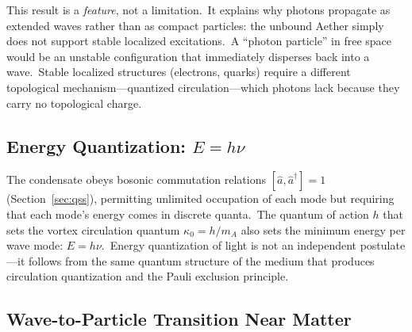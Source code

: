 ﻿\documentclass[12pt,letterpaper]{article}
\begin{document}
This result is a \emph{feature}, not a limitation.\ It explains why photons propagate as
extended waves rather than as compact particles: the unbound Aether simply does not support
stable localized excitations.\ A ``photon particle'' in free space would be an unstable
configuration that immediately disperses back into a wave.\ Stable localized structures
(electrons, quarks) require a different topological mechanism---quantized circulation---which
photons lack because they carry no topological charge.

\subsection{Energy Quantization: $E = h\nu$}

The condensate obeys bosonic commutation relations
$[\hat{a}, \hat{a}^\dagger] = 1$ (Section~\ref{sec:qss}), permitting unlimited occupation
of each mode but requiring that each mode's energy comes in discrete quanta.\ The quantum
of action $h$ that sets the vortex circulation quantum $\kappa_0 = h/m_A$ also sets the
minimum energy per wave mode: $E = h\nu$.\ Energy quantization of light is not an
independent postulate---it follows from the same quantum structure of the medium that
produces circulation quantization and the Pauli exclusion principle.

\subsection{Wave-to-Particle Transition Near Matter}
\label{sec:wave-to-particle}
\end{document}
